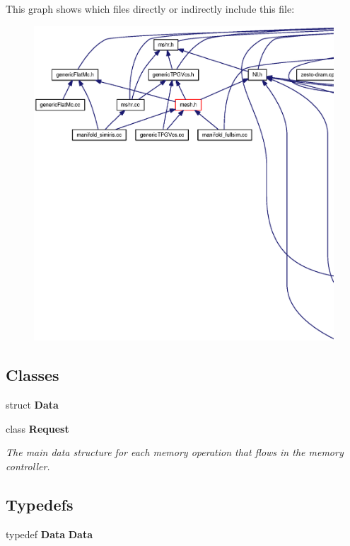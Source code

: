 This graph shows which files directly or indirectly include this file:\nopagebreak
\begin{figure}[H]
\begin{center}
\leavevmode
\includegraphics[width=420pt]{request_8h__dep__incl}
\end{center}
\end{figure}
\subsection*{Classes}
\begin{CompactItemize}
\item 
struct {\bf Data}
\item 
class {\bf Request}
\begin{CompactList}\small\item\em The main data structure for each memory operation that flows in the memory controller. \item\end{CompactList}\end{CompactItemize}
\subsection*{Typedefs}
\begin{CompactItemize}
\item 
typedef {\bf Data} {\bf Data}
\end{CompactItemize}
